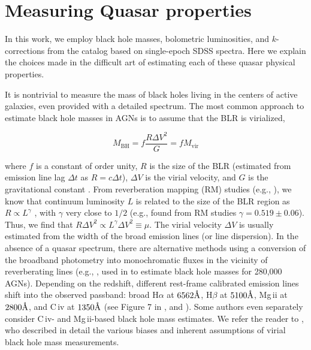 \documentclass[twocolumn]{aastex62}
\let\oldAA\AA
\renewcommand{\AA}{\text{\normalfont\oldAA}}
\begin{document}
\appendix
\section{Measuring Quasar properties} 
\label{app:measureBHmass}
In this work, we employ black hole masses, bolometric luminosities, and $k$-corrections from the \cite{shen2011} catalog based on single-epoch SDSS spectra. Here we explain the choices made in the difficult art of estimating each of these quasar physical properties.

It is nontrivial to measure the mass of black holes living in the centers of active galaxies, even provided with a detailed spectrum. The most common  approach to estimate black hole masses in AGNs is to assume that the BLR is virialized,


\begin{equation}
M_{\mathrm{BH}} = f \frac{ R\Delta V^{2} }{G} = f M_{\mathrm{vir}}
\end{equation}


where $f$ is a constant of order unity, $R$ is the size of the BLR (estimated from  emission line lag $\Delta t$ as $R = c \Delta t$), $\Delta V$ is the virial velocity, and $G$ is the gravitational constant \citep{shen2008}.  From reverberation mapping (RM) studies (e.g., \citealt{shen2019}), we know that continuum luminosity $L$ is related to the size of the BLR region as $R \propto L^{\gamma}$ \citep{vestergaard2006}, with $\gamma$ very close to $1/2$ (e.g., \citealt{bentz2009} found from RM studies $\gamma = 0.519 \pm 0.06$). Thus, we find  that $R \Delta V^{2} \propto L^{\gamma} \Delta V^{2} \equiv \mu$. The virial velocity $\Delta V$ is usually estimated from the width of the broad emission lines (or line dispersion).  In the absence of a quasar spectrum, there are alternative methods using a conversion of the broadband photometry into monochromatic fluxes in the vicinity of reverberating lines (e.g., \citealt{kozlowski2015}, used in \citealt{kozlowski2017b} to estimate black hole masses for 280,000 AGNs). Depending on the redshift, different rest-frame calibrated emission lines shift into the observed passband: broad H$\alpha$ at  $6562\mbox{\AA}$, H$\beta$ at  $5100 \mbox{\AA}$, Mg\,{\sc ii} at $2800\mbox{\AA}$, and C\,{\sc iv} at $1350\mbox{\AA}$ (see Figure 7 in \citealt{shen2019}, and \citealt{vestergaard2002}). Some authors even separately consider  C\,{\sc iv}- and  Mg\,{\sc ii}-based  black hole mass estimates. We refer the reader to \citet{shen2008}, who described in detail the various biases and inherent assumptions of virial black hole mass measurements. 
\end{document}
